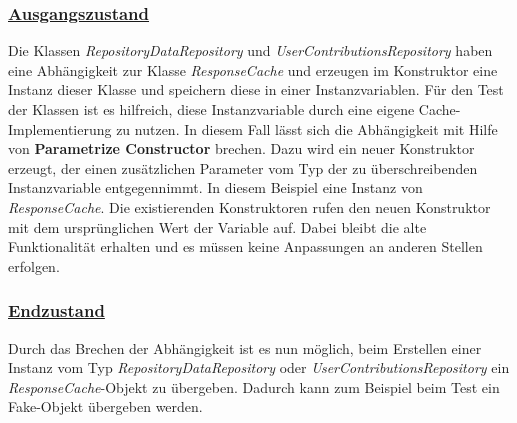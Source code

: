 \documentclass[12pt]{article}
\begin{document}
\subsubsection*{\href{https://github.com/lukaspanni/OpenSourceStats/tree/3b1eb5bf6750c3ccaeb05962ec8a8ae743adbf2c/app/src/main/java/de/lukaspanni/opensourcestats/repository}{Ausgangszustand}}

Die Klassen \textit{RepositoryDataRepository} und \textit{UserContributionsRepository} haben eine Abhängigkeit zur Klasse \textit{ResponseCache} und erzeugen im Konstruktor eine Instanz dieser Klasse und speichern diese in einer Instanzvariablen.
Für den Test der Klassen ist es hilfreich, diese Instanzvariable durch eine eigene Cache-Implementierung zu nutzen.
In diesem Fall lässt sich die Abhängigkeit mit Hilfe von \textbf{Parametrize Constructor} brechen.
\newline
Dazu wird ein neuer Konstruktor erzeugt, der einen zusätzlichen Parameter vom Typ der zu überschreibenden Instanzvariable entgegennimmt. In diesem Beispiel eine Instanz von \textit{ResponseCache}. Die existierenden Konstruktoren rufen den neuen Konstruktor mit dem ursprünglichen Wert der Variable auf.
Dabei bleibt die alte Funktionalität erhalten und es müssen keine Anpassungen an anderen Stellen erfolgen.

\subsubsection*{\href{https://github.com/lukaspanni/OpenSourceStats/tree/d098b93ffd042cb095af679254ed01584417763e/app/src/main/java/de/lukaspanni/opensourcestats/repository}{Endzustand}}

Durch das Brechen der Abhängigkeit ist es nun möglich, beim Erstellen einer Instanz vom Typ \textit{RepositoryDataRepository} oder \textit{UserContributionsRepository} ein \textit{ResponseCache}-Objekt zu übergeben. Dadurch kann zum Beispiel beim Test ein Fake-Objekt übergeben werden.
\newpage

\end{document}
